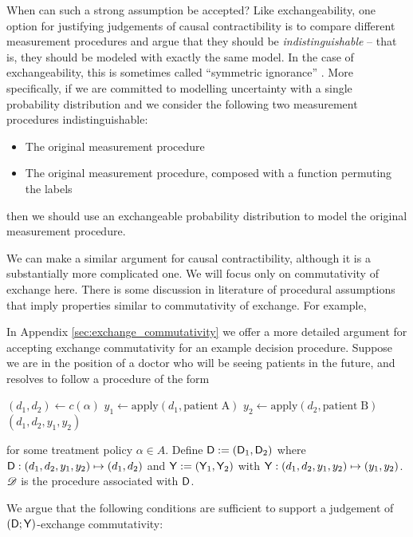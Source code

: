 When can such a strong assumption be accepted? Like exchangeability, one option for justifying judgements of causal contractibility is to compare different measurement procedures and argue that they should be \emph{indistinguishable} -- that is, they should be modeled with exactly the same model. In the case of exchangeability, this is sometimes called ``symmetric ignorance'' \citet[chap. ~5]{gelman_bayesian_2021}. More specifically, if we are committed to modelling uncertainty with a single probability distribution and we consider the following two measurement procedures indistinguishable:
\begin{itemize}
    \item The original measurement procedure
    \item The original measurement procedure, composed with a function permuting the labels
\end{itemize}
then we should use an exchangeable probability distribution to model the original measurement procedure.

We can make a similar argument for causal contractibility, although it is a substantially more complicated one. We will focus only on commutativity of exchange here. There is some discussion in literature of procedural assumptions that imply properties similar to commutativity of exchange. For example, 



In Appendix \ref{sec:exchange_commutativity} we offer a more detailed argument for accepting exchange commutativity for an example decision procedure. Suppose we are in the position of a doctor who will be seeing patients in the future, and resolves to follow a procedure of the form

\begin{algorithmic}
    \State $(d_1,d_2) \gets c(\alpha)$
    \State $y_1\gets \mathrm{apply}(d_1,\mathrm{patient\;A})$
    \State $y_2\gets \mathrm{apply}(d_2,\mathrm{patient\;B})$
    \State \Return $(d_1,d_2,y_1,y_2)$
    \EndProcedure
\end{algorithmic}

for some treatment policy $\alpha\in A$. Define $\mathsf{D}:=(\mathsf{D}_1,\mathsf{D}_2)$ where $\mathsf{D}:(d_1,d_2,y_1,y_2)\mapsto (d_1,d_2)$ and $\mathsf{Y}:=(\mathsf{Y}_1,\mathsf{Y}_2)$ with $\mathsf{Y}:(d_1,d_2,y_1,y_2)\mapsto (y_1,y_2)$. $\mathscr{D}$ is the procedure associated with $\mathsf{D}$.

We argue that the following conditions are sufficient to support a judgement of $(\mathsf{D};\mathsf{Y})$-exchange commutativity:

